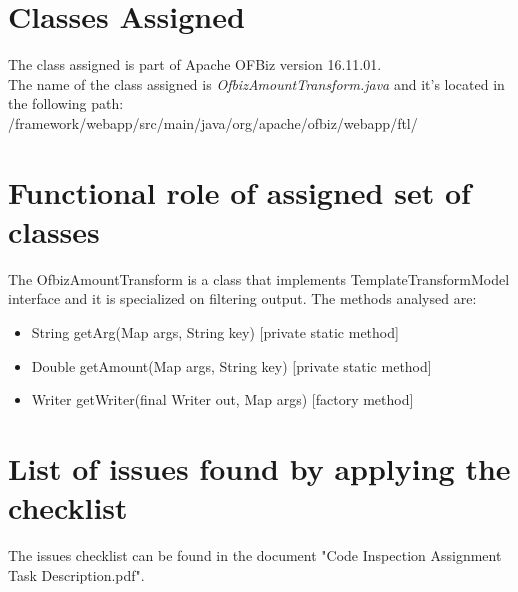 \documentclass{article}
\begin{document}
	\section{Classes Assigned}
		The class assigned is part of Apache OFBiz version 16.11.01. \\
		The name of the class assigned is \textit{OfbizAmountTransform.java} and it's located in the following path: \\
		/framework/webapp/src/main/java/org/apache/ofbiz/webapp/ftl/
		
	\section{Functional role of assigned set of classes}
		The OfbizAmountTransform is a class  that implements TemplateTransformModel interface and it is specialized on filtering output.
		The methods analysed are:
		\begin{itemize}
			\item String getArg(Map args, String key) [private static method]
			\item Double getAmount(Map args, String key) [private static method]
			\item Writer getWriter(final Writer out, Map args) [factory method]
			
		\end{itemize}
		\pagebreak
	
	\section{List of issues found by applying the checklist}
		The issues checklist can be found in the document "Code Inspection Assignment Task Description.pdf".
\end{document}
